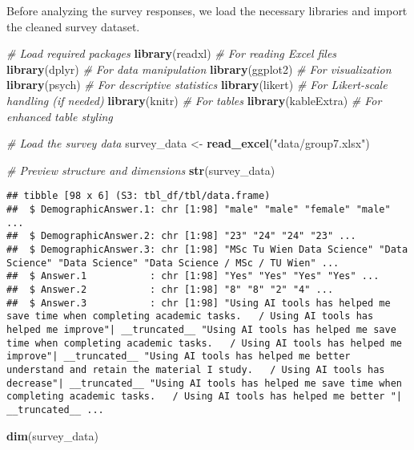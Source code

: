 \documentclass[
]{article}
\newenvironment{Shaded}{\begin{snugshade}}{\end{snugshade}}
\newcommand{\CommentTok}[1]{\textcolor[rgb]{0.56,0.35,0.01}{\textit{#1}}}
\newcommand{\FunctionTok}[1]{\textcolor[rgb]{0.13,0.29,0.53}{\textbf{#1}}}
\newcommand{\NormalTok}[1]{#1}
\newcommand{\OtherTok}[1]{\textcolor[rgb]{0.56,0.35,0.01}{#1}}
\newcommand{\StringTok}[1]{\textcolor[rgb]{0.31,0.60,0.02}{#1}}
\begin{document}
Before analyzing the survey responses, we load the necessary libraries
and import the cleaned survey dataset.

\begin{Shaded}
\begin{Highlighting}[]
\CommentTok{\# Load required packages}
\FunctionTok{library}\NormalTok{(readxl)        }\CommentTok{\# For reading Excel files}
\FunctionTok{library}\NormalTok{(dplyr)         }\CommentTok{\# For data manipulation}
\FunctionTok{library}\NormalTok{(ggplot2)       }\CommentTok{\# For visualization}
\FunctionTok{library}\NormalTok{(psych)         }\CommentTok{\# For descriptive statistics}
\FunctionTok{library}\NormalTok{(likert)        }\CommentTok{\# For Likert{-}scale handling (if needed)}
\FunctionTok{library}\NormalTok{(knitr)         }\CommentTok{\# For tables}
\FunctionTok{library}\NormalTok{(kableExtra)    }\CommentTok{\# For enhanced table styling}

\CommentTok{\# Load the survey data}
\NormalTok{survey\_data }\OtherTok{\textless{}{-}} \FunctionTok{read\_excel}\NormalTok{(}\StringTok{"data/group7.xlsx"}\NormalTok{)}

\CommentTok{\# Preview structure and dimensions}
\FunctionTok{str}\NormalTok{(survey\_data)}
\end{Highlighting}
\end{Shaded}

\begin{verbatim}
## tibble [98 x 6] (S3: tbl_df/tbl/data.frame)
##  $ DemographicAnswer.1: chr [1:98] "male" "male" "female" "male" ...
##  $ DemographicAnswer.2: chr [1:98] "23" "24" "24" "23" ...
##  $ DemographicAnswer.3: chr [1:98] "MSc Tu Wien Data Science" "Data Science" "Data Science" "Data Science / MSc / TU Wien" ...
##  $ Answer.1           : chr [1:98] "Yes" "Yes" "Yes" "Yes" ...
##  $ Answer.2           : chr [1:98] "8" "8" "2" "4" ...
##  $ Answer.3           : chr [1:98] "Using AI tools has helped me save time when completing academic tasks.   / Using AI tools has helped me improve"| __truncated__ "Using AI tools has helped me save time when completing academic tasks.   / Using AI tools has helped me improve"| __truncated__ "Using AI tools has helped me better understand and retain the material I study.   / Using AI tools has decrease"| __truncated__ "Using AI tools has helped me save time when completing academic tasks.   / Using AI tools has helped me better "| __truncated__ ...
\end{verbatim}

\begin{Shaded}
\begin{Highlighting}[]
\FunctionTok{dim}\NormalTok{(survey\_data)}
\end{Highlighting}
\end{Shaded}
\end{document}
